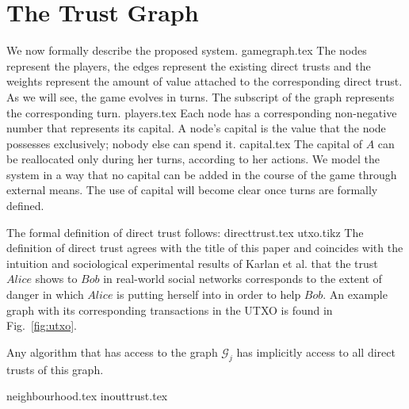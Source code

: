\section{The Trust Graph}
  We now formally describe the proposed system.
  {gamegraph.tex}
  \noindent The nodes represent the players, the edges represent the existing direct trusts and the weights represent the
  amount of value attached to the corresponding direct trust. As we will see, the game evolves in turns. The subscript of the
  graph represents the corresponding turn.
  {players.tex}
  \noindent Each node has a corresponding non-negative number that represents its capital. A node's capital is the value that
  the node possesses exclusively; nobody else can spend it.
  {capital.tex}
  \noindent The capital of $A$ can be reallocated only during her turns, according to her actions. We model the system in a
  way that no capital can be added in the course of the game through external means. The use of capital will become clear once
  turns are formally defined.

  The formal definition of direct trust follows:
  {directtrust.tex}
  {utxo.tikz}
  \noindent The definition of direct trust agrees with the title of this paper and coincides with the intuition and
  sociological experimental results of Karlan et al. \cite{kmrs} that the trust $Alice$ shows to $Bob$ in real-world social
  networks corresponds to the extent of danger in which $Alice$ is putting herself into in order to help $Bob$. An example
  graph with its corresponding transactions in the UTXO is found in Fig.~\ref{fig:utxo}.


  Any algorithm that has access to the graph $\mathcal{G}_j$ has implicitly access to all direct trusts of this graph.

  {neighbourhood.tex}
  {inouttrust.tex}
